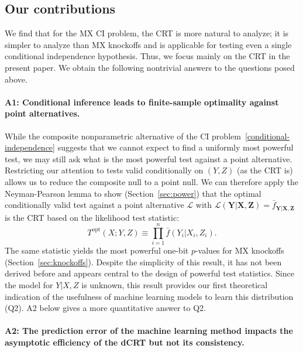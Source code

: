 \documentclass[12pt]{article}
\theoremstyle{definition}
\theoremstyle{remark}
\newcommand{\prx}{\bm X}
\newcommand{\srx}{X}
\newcommand{\prz}{\bm Z}
\newcommand{\srz}{Z}
\newcommand{\pry}{{\bm Y}}
\newcommand{\sry}{Y}
\begin{document}
\subsection{Our contributions}



We find that for the MX CI problem, the CRT is more natural to analyze; it is simpler to analyze than MX knockoffs and is applicable for testing even a single conditional independence hypothesis. Thus, we focus mainly on the CRT in the present paper. We obtain the following nontrivial answers to the questions posed above.

\paragraph{A1: Conditional inference leads to finite-sample optimality against point alternatives.}

While the composite nonparametric alternative of the CI problem~\eqref{conditional-independence} suggests that we cannot expect to find a uniformly most powerful test, we may still ask what is the most powerful test against a point alternative. Restricting our attention to tests valid conditionally on $(\sry, \srz)$ (as the CRT is) allows us to reduce the composite null to a point null. We can therefore apply the Neyman-Pearson lemma to show (Section~\ref{sec:power}) that the optimal conditionally valid test against a point alternative $\mathcal L$ with $\mathcal L(\pry|\prx,\prz) = \bar f_{\pry|\prx,\prz}$ is the CRT based on the likelihood test statistic:
\begin{equation}
	T^{\text{opt}}(\srx; \sry, \srz) \equiv \prod_{i = 1}^n \bar f(\sry_i|\srx_i, \srz_i).
\end{equation}
The same statistic yields the most powerful one-bit $p$-values for MX knockoffs (Section~\ref{sec:knockoffs}). Despite the simplicity of this result, it has not been derived before and appears central to the design of powerful test statistics. Since the model for $Y|X,Z$ is unknown, this result provides our first theoretical indication of the usefulness of machine learning models to learn this distribution (Q2). A2 below gives a more quantitative answer to Q2.

\paragraph{A2: The prediction error of the machine learning method impacts the asymptotic efficiency of the dCRT but not its consistency.}
\end{document}
